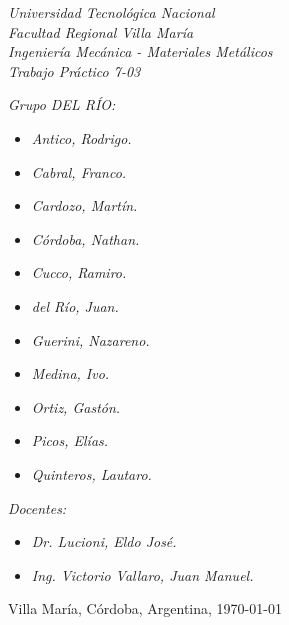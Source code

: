 \begin{titlepage}
	
	\begin{center}
		{\huge \textit{Universidad Tecnológica Nacional}}\\
        \vspace{0.5cm}
		{\LARGE \textit{Facultad Regional Villa María}}\\
		\vspace{1.5cm}
        {\LARGE{\textit{Ingeniería Mecánica - Materiales Metálicos}}}\\
		\vspace{1.5cm}
        \LARGE{\textit{Trabajo Práctico 7-03}}
	\end{center}
	
	\vfill

    \textit{Grupo DEL RÍO:}
	\begin{itemize}
		\item \textit{Antico, Rodrigo.}
		\item \textit{Cabral, Franco.}
        \item \textit{Cardozo, Martín.}
        \item \textit{Córdoba, Nathan.}
        \item \textit{Cucco, Ramiro.}
        \item \textit{del Río, Juan.}
        \item \textit{Guerini, Nazareno.}
        \item \textit{Medina, Ivo.}
        \item \textit{Ortiz, Gastón.}
        \item \textit{Picos, Elías.}
        \item \textit{Quinteros, Lautaro.}
	\end{itemize}
    
	\textit{Docentes:}
	\begin{itemize}
		\item \textit{Dr. Lucioni, Eldo José.}
		\item \textit{Ing. Victorio Vallaro, Juan Manuel.}
	\end{itemize}
	\begin{center}
		Villa María, Córdoba, Argentina, \today
	\end{center}
	
\end{titlepage}
